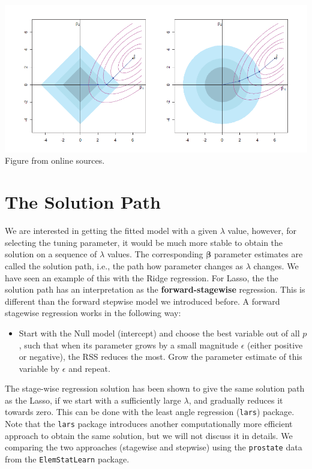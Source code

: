 \documentclass[
]{book}
\providecommand{\tightlist}{%
  \setlength{\itemsep}{0pt}\setlength{\parskip}{0pt}}
\theoremstyle{definition}
\theoremstyle{definition}
\theoremstyle{definition}
\theoremstyle{definition}
\theoremstyle{remark}
\begin{document}
\includegraphics[width=1\textwidth,height=\textheight]{images/lassoridge2.png} Figure from online sources.

\hypertarget{the-solution-path}{%
\section{The Solution Path}\label{the-solution-path}}

We are interested in getting the fitted model with a given \(\lambda\) value, however, for selecting the tuning parameter, it would be much more stable to obtain the solution on a sequence of \(\lambda\) values. The corresponding \(\boldsymbol \beta\) parameter estimates are called the solution path, i.e., the path how parameter changes as \(\lambda\) changes. We have seen an example of this with the Ridge regression. For Lasso, the the solution path has an interpretation as the \textbf{forward-stagewise} regression. This is different than the forward stepwise model we introduced before. A forward stagewise regression works in the following way:

\begin{itemize}
\tightlist
\item
  Start with the Null model (intercept) and choose the best variable out of all \(p\), such that when its parameter grows by a small magnitude \(\epsilon\) (either positive or negative), the RSS reduces the most. Grow the parameter estimate of this variable by \(\epsilon\) and repeat.
\end{itemize}

The stage-wise regression solution has been shown to give the same solution path as the Lasso, if we start with a sufficiently large \(\lambda\), and gradually reduces it towards zero. This can be done with the least angle regression (\texttt{lars}) package. Note that the \texttt{lars} package introduces another computationally more efficient approach to obtain the same solution, but we will not discuss it in details. We comparing the two approaches (stagewise and stepwise) using the \texttt{prostate} data from the \texttt{ElemStatLearn} package.
\end{document}
